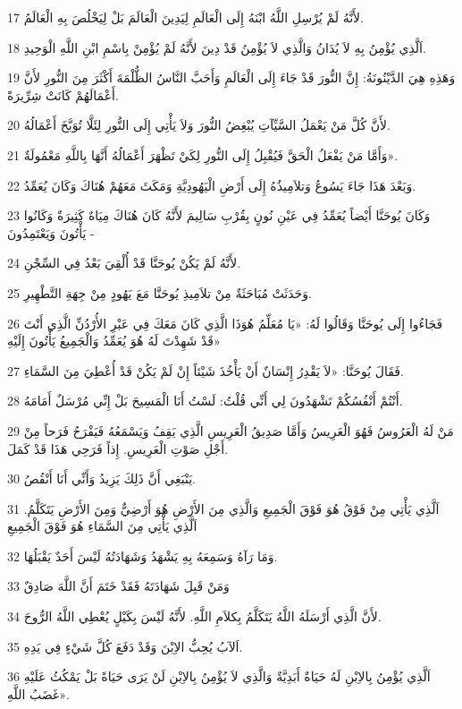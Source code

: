 \par 17 لأَنَّهُ لَمْ يُرْسِلِ اللَّهُ ابْنَهُ إِلَى الْعَالَمِ لِيَدِينَ الْعَالَمَ بَلْ لِيَخْلُصَ بِهِ الْعَالَمُ.
\par 18 اَلَّذِي يُؤْمِنُ بِهِ لاَ يُدَانُ وَالَّذِي لاَ يُؤْمِنُ قَدْ دِينَ لأَنَّهُ لَمْ يُؤْمِنْ بِاسْمِ ابْنِ اللَّهِ الْوَحِيدِ.
\par 19 وَهَذِهِ هِيَ الدَّيْنُونَةُ: إِنَّ النُّورَ قَدْ جَاءَ إِلَى الْعَالَمِ وَأَحَبَّ النَّاسُ الظُّلْمَةَ أَكْثَرَ مِنَ النُّورِ لأَنَّ أَعْمَالَهُمْ كَانَتْ شِرِّيرَةً.
\par 20 لأَنَّ كُلَّ مَنْ يَعْمَلُ السَّيِّآتِ يُبْغِضُ النُّورَ وَلاَ يَأْتِي إِلَى النُّورِ لِئَلَّا تُوَبَّخَ أَعْمَالُهُ.
\par 21 وَأَمَّا مَنْ يَفْعَلُ الْحَقَّ فَيُقْبِلُ إِلَى النُّورِ لِكَيْ تَظْهَرَ أَعْمَالُهُ أَنَّهَا بِاللَّهِ مَعْمُولَةٌ».
\par 22 وَبَعْدَ هَذَا جَاءَ يَسُوعُ وَتلاَمِيذُهُ إِلَى أَرْضِ الْيَهُودِيَّةِ وَمَكَثَ مَعَهُمْ هُنَاكَ وَكَانَ يُعَمِّدُ.
\par 23 وَكَانَ يُوحَنَّا أَيْضاً يُعَمِّدُ فِي عَيْنِ نُونٍ بِقُرْبِ سَالِيمَ لأَنَّهُ كَانَ هُنَاكَ مِيَاهٌ كَثِيرَةٌ وَكَانُوا يَأْتُونَ وَيَعْتَمِدُونَ -
\par 24 لأَنَّهُ لَمْ يَكُنْ يُوحَنَّا قَدْ أُلْقِيَ بَعْدُ فِي السِّجْنِ.
\par 25 وَحَدَثَتْ مُبَاحَثَةٌ مِنْ تلاَمِيذِ يُوحَنَّا مَعَ يَهُودٍ مِنْ جِهَةِ التَّطْهِيرِ.
\par 26 فَجَاءُوا إِلَى يُوحَنَّا وَقَالُوا لَهُ: «يَا مُعَلِّمُ هُوَذَا الَّذِي كَانَ مَعَكَ فِي عَبْرِ الأُرْدُنِّ الَّذِي أَنْتَ قَدْ شَهِدْتَ لَهُ هُوَ يُعَمِّدُ وَالْجَمِيعُ يَأْتُونَ إِلَيْهِ»
\par 27 فَقَالَ يُوحَنَّا: «لاَ يَقْدِرُ إِنْسَانٌ أَنْ يَأْخُذَ شَيْئاً إِنْ لَمْ يَكُنْ قَدْ أُعْطِيَ مِنَ السَّمَاءِ.
\par 28 أَنْتُمْ أَنْفُسُكُمْ تَشْهَدُونَ لِي أَنِّي قُلْتُ: لَسْتُ أَنَا الْمَسِيحَ بَلْ إِنِّي مُرْسَلٌ أَمَامَهُ.
\par 29 مَنْ لَهُ الْعَرُوسُ فَهُوَ الْعَرِيسُ وَأَمَّا صَدِيقُ الْعَرِيسِ الَّذِي يَقِفُ وَيَسْمَعُهُ فَيَفْرَحُ فَرَحاً مِنْ أَجْلِ صَوْتِ الْعَرِيسِ. إِذاً فَرَحِي هَذَا قَدْ كَمَلَ.
\par 30 يَنْبَغِي أَنَّ ذَلِكَ يَزِيدُ وَأَنِّي أَنَا أَنْقُصُ.
\par 31 اَلَّذِي يَأْتِي مِنْ فَوْقُ هُوَ فَوْقَ الْجَمِيعِ وَالَّذِي مِنَ الأَرْضِ هُوَ أَرْضِيٌّ وَمِنَ الأَرْضِ يَتَكَلَّمُ. اَلَّذِي يَأْتِي مِنَ السَّمَاءِ هُوَ فَوْقَ الْجَمِيعِ
\par 32 وَمَا رَآهُ وَسَمِعَهُ بِهِ يَشْهَدُ وَشَهَادَتُهُ لَيْسَ أَحَدٌ يَقْبَلُهَا.
\par 33 وَمَنْ قَبِلَ شَهَادَتَهُ فَقَدْ خَتَمَ أَنَّ اللَّهَ صَادِقٌ
\par 34 لأَنَّ الَّذِي أَرْسَلَهُ اللَّهُ يَتَكَلَّمُ بِكلاَمِ اللَّهِ. لأَنَّهُ لَيْسَ بِكَيْلٍ يُعْطِي اللَّهُ الرُّوحَ.
\par 35 اَلآبُ يُحِبُّ الاِبْنَ وَقَدْ دَفَعَ كُلَّ شَيْءٍ فِي يَدِهِ.
\par 36 اَلَّذِي يُؤْمِنُ بِالاِبْنِ لَهُ حَيَاةٌ أَبَدِيَّةٌ وَالَّذِي لاَ يُؤْمِنُ بِالاِبْنِ لَنْ يَرَى حَيَاةً بَلْ يَمْكُثُ عَلَيْهِ غَضَبُ اللَّهِ».

